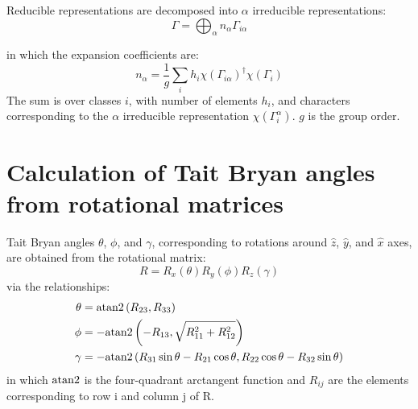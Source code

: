 \documentclass[twocolumn,showpacs,preprintnumbers,superscriptaddress,prb,floatfix,aps,10pt]{revtex4-1}
\begin{document}
Reducible representations are decomposed into $\alpha$ irreducible representations:
\begin{equation}
\label{eq:irrep_decomposition}
\Gamma = \bigoplus_\alpha n_\alpha \Gamma_{i\alpha}
\end{equation}

in which the expansion coefficients are:
\begin{equation}
\label{eq:irrep_decomposition_coefficients}
n_\alpha = \frac{1}{g} \sum_i h_i \chi\left(\Gamma_{i\alpha}\right)^\dag \chi\left(\Gamma_i\right)
\end{equation}
The sum is over classes $i$, with number of elements $h_i$, and characters corresponding to the $\alpha$ irreducible representation $\chi(\Gamma_i^\alpha)$. $g$ is the group order.





%
%
%
\section{Calculation of Tait Bryan angles from rotational matrices}
Tait Bryan angles $\theta$, $\phi$, and $\gamma$, corresponding to rotations around $\hat{z}$, $\hat{y}$, and $\hat{x}$ axes, are obtained from the rotational matrix:
\begin{equation}
\label{eq:rotation}
R = R_x(\theta)R_y(\phi)R_z(\gamma)
\end{equation}
via the relationships:
\begin{align}
\label{eq:tait_bryan_angles}
\theta & = {\rm atan2}\left(R_{23},R_{33}\right) \\
\phi   & =-{\rm atan2}\left(-R_{13},\sqrt{R_{11}^2+R_{12}^2}\right) \\
\gamma & =-{\rm atan2}\left(R_{31}\sin{\theta}-R_{21}\cos{\theta},R_{22}\cos{\theta}-R_{32}\sin{\theta}\right)
\end{align}
in which ${\rm atan2}$ is the four-quadrant arctangent function and $R_{ij}$ are the elements corresponding to row i and column j of R. 
\end{document}
